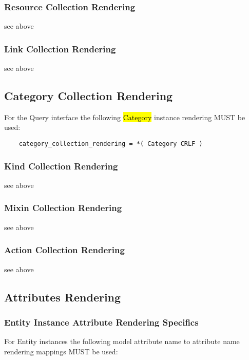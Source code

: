 \documentclass[10pt,a4paper]{article}
\begin{document}
\subsubsection{Resource Collection Rendering}

see above

\subsubsection{Link Collection Rendering}

see above

\subsection{Category Collection Rendering}

For the Query interface the following \hl{Category} instance rendering MUST be used:

\begin{verbatim}
	category_collection_rendering = *( Category CRLF )
\end{verbatim}

\subsubsection{Kind Collection Rendering}

see above

\subsubsection{Mixin Collection Rendering}

see above

\subsubsection{Action Collection Rendering}

see above

\subsection{Attributes Rendering}

\subsubsection{Entity Instance Attribute Rendering Specifics}

For Entity instances the following model attribute name to attribute name rendering mappings MUST be used:
\end{document}
